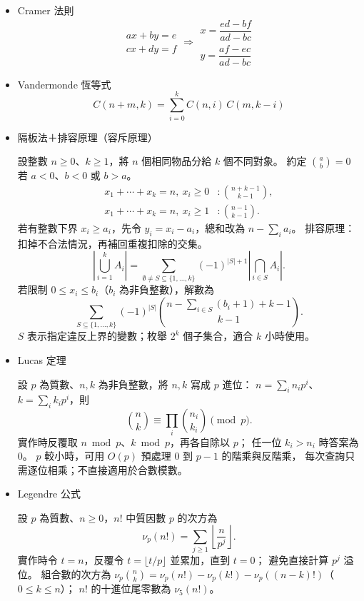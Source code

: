 \begin{itemize}
\item Cramer 法則
$$
\begin{aligned}ax+by=e\\cx+dy=f\end{aligned}
\Rightarrow
\begin{aligned}x=\dfrac{ed-bf}{ad-bc}\\y=\dfrac{af-ec}{ad-bc}\end{aligned}
$$

\item Vandermonde 恆等式
$$
C(n+m,k)=\sum_{i=0}^{k} C(n,i)\,C(m,k-i)
$$

\item 隔板法＋排容原理（容斥原理）

設整數 $n\ge0$、$k\ge1$，將 $n$ 個相同物品分給 $k$ 個不同對象。
約定 $\binom ab=0$ 若 $a<0$、$b<0$ 或 $b>a$。
\[
\begin{aligned}
x_1+\cdots+x_k=n,\ x_i\ge0 &: \binom{n+k-1}{k-1},\\
x_1+\cdots+x_k=n,\ x_i\ge1 &: \binom{n-1}{k-1}.
\end{aligned}
\]
若有整數下界 $x_i\ge a_i$，先令 $y_i=x_i-a_i$，總和改為 $n-\sum_i a_i$。
排容原理：扣掉不合法情況，再補回重複扣除的交集。
\[
\left|\bigcup_{i=1}^{k}A_i\right|
=\sum_{\emptyset\ne S\subseteq\{1,\ldots,k\}}
(-1)^{|S|+1}\left|\bigcap_{i\in S}A_i\right|.
\]
若限制 $0\le x_i\le b_i$（$b_i$ 為非負整數），解數為
\[
\sum_{S\subseteq\{1,\ldots,k\}}(-1)^{|S|}
\binom{n-\sum_{i\in S}(b_i+1)+k-1}{k-1}.
\]
$S$ 表示指定違反上界的變數；枚舉 $2^k$ 個子集合，適合 $k$ 小時使用。

\item Lucas 定理

設 $p$ 為質數、$n,k$ 為非負整數，將 $n,k$ 寫成 $p$ 進位：
$n=\sum_i n_i p^i$、$k=\sum_i k_i p^i$，則
\[
\binom nk\equiv\prod_i\binom{n_i}{k_i}\pmod p.
\]
實作時反覆取 $n\bmod p$、$k\bmod p$，再各自除以 $p$；
任一位 $k_i>n_i$ 時答案為 $0$。
$p$ 較小時，可用 $O(p)$ 預處理 $0$ 到 $p-1$ 的階乘與反階乘，
每次查詢只需逐位相乘；不直接適用於合數模數。

\item Legendre 公式

設 $p$ 為質數、$n\ge0$，$n!$ 中質因數 $p$ 的次方為
\[
\nu_p(n!)=\sum_{j\ge1}\left\lfloor\frac{n}{p^j}\right\rfloor.
\]
實作時令 $t=n$，反覆令 $t=\lfloor t/p\rfloor$ 並累加，直到 $t=0$；
避免直接計算 $p^j$ 溢位。
組合數的次方為 $\nu_p\!\binom nk=\nu_p(n!)-\nu_p(k!)-\nu_p((n-k)!)$（$0\le k\le n$）；
$n!$ 的十進位尾零數為 $\nu_5(n!)$。


\end{itemize}
